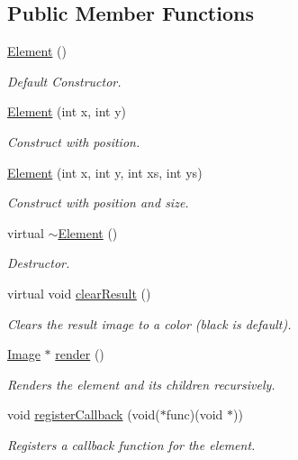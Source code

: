 \subsection*{Public Member Functions}
\begin{DoxyCompactItemize}
\item 
\hyperlink{class_element_ab0d0e20be9a36ae676202db753faeec9}{Element} ()
\begin{DoxyCompactList}\small\item\em Default Constructor. \end{DoxyCompactList}\item 
\hyperlink{class_element_ae385b104c66f092731777d70775b7f55}{Element} (int x, int y)
\begin{DoxyCompactList}\small\item\em Construct with position. \end{DoxyCompactList}\item 
\hyperlink{class_element_aabaef3fcc0959ea3c5b43f59522d0a1e}{Element} (int x, int y, int xs, int ys)
\begin{DoxyCompactList}\small\item\em Construct with position and size. \end{DoxyCompactList}\item 
virtual \hyperlink{class_element_a13d54ba9c08b6bec651402f1c2bb002c}{$\sim$\-Element} ()
\begin{DoxyCompactList}\small\item\em Destructor. \end{DoxyCompactList}\item 
virtual void \hyperlink{class_element_a7a110bce4630cd7b35b1c2d401774598}{clear\-Result} ()
\begin{DoxyCompactList}\small\item\em Clears the result image to a color (black is default). \end{DoxyCompactList}\item 
\hyperlink{class_image}{Image} $\ast$ \hyperlink{class_element_a2410f72a9b5abcf43641ef1b9e50f646}{render} ()
\begin{DoxyCompactList}\small\item\em Renders the element and its children recursively. \end{DoxyCompactList}\item 
void \hyperlink{class_element_af3291346742556571a5c8578d2fc7026}{register\-Callback} (void($\ast$func)(void $\ast$))
\begin{DoxyCompactList}\small\item\em Registers a callback function for the element. \end{DoxyCompactList}\item 

\end{DoxyCompactItemize}
